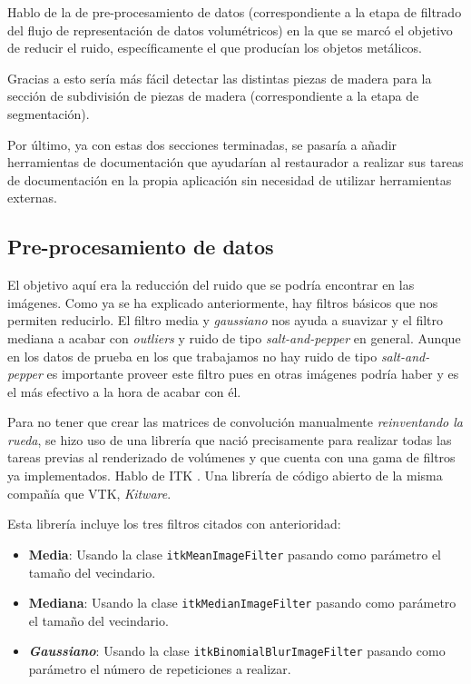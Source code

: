 Hablo de la de pre-procesamiento de datos (correspondiente a la etapa de filtrado del flujo de representación de datos volumétricos) en la que se marcó el objetivo de reducir el ruido, específicamente el que producían los objetos metálicos. 

Gracias a esto sería más fácil detectar las distintas piezas de madera para la sección de subdivisión de piezas de madera (correspondiente a la etapa de segmentación). 

Por último, ya con estas dos secciones terminadas, se pasaría a añadir herramientas de documentación que ayudarían al restaurador a realizar sus tareas de documentación en la propia aplicación sin necesidad de utilizar herramientas externas.

\subsection{Pre-procesamiento de datos}

El objetivo aquí era la reducción del ruido que se podría encontrar en las imágenes. Como ya se ha explicado anteriormente, hay filtros básicos que nos permiten reducirlo. El filtro media y \textit{gaussiano} nos ayuda a suavizar y el filtro mediana a acabar con \textit{outliers} y ruido de tipo \textit{salt-and-pepper} en general. Aunque en los datos de prueba en los que trabajamos no hay ruido de tipo \textit{salt-and-pepper} es importante proveer este filtro pues en otras imágenes podría haber y es el más efectivo a la hora de acabar con él.

Para no tener que crear las matrices de convolución manualmente \textit{reinventando la rueda}, se hizo uso de una librería que nació precisamente para realizar todas las tareas previas al renderizado de volúmenes y que cuenta con una gama de filtros ya implementados. Hablo de ITK \cite{itk}. Una librería de código abierto de la misma compañía que VTK, \textit{Kitware}.

Esta librería incluye los tres filtros citados con anterioridad:

\begin{itemize}
	\item \textbf{Media}: Usando la clase \texttt{itkMeanImageFilter} pasando como parámetro el tamaño del vecindario.
	\item \textbf{Mediana}: Usando la clase \texttt{itkMedianImageFilter} pasando como parámetro el tamaño del vecindario.
	\item \textbf{\textit{Gaussiano}}: Usando la clase \texttt{itkBinomialBlurImageFilter} pasando como parámetro el número de repeticiones a realizar.
\end{itemize}

